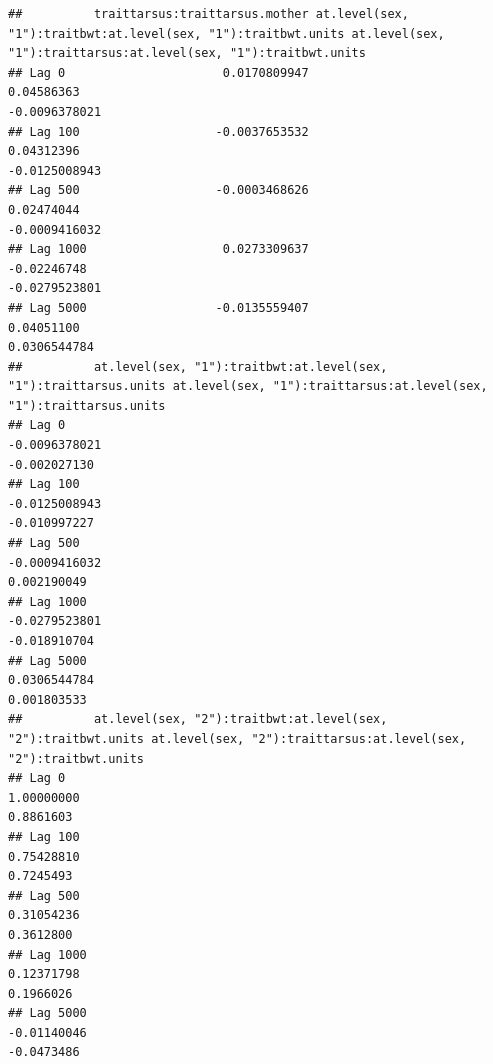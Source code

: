 \documentclass[
  12pt,
]{book}
\begin{document}
\begin{verbatim}
##          traittarsus:traittarsus.mother at.level(sex, "1"):traitbwt:at.level(sex, "1"):traitbwt.units at.level(sex, "1"):traittarsus:at.level(sex, "1"):traitbwt.units
## Lag 0                      0.0170809947                                                    0.04586363                                                    -0.0096378021
## Lag 100                   -0.0037653532                                                    0.04312396                                                    -0.0125008943
## Lag 500                   -0.0003468626                                                    0.02474044                                                    -0.0009416032
## Lag 1000                   0.0273309637                                                   -0.02246748                                                    -0.0279523801
## Lag 5000                  -0.0135559407                                                    0.04051100                                                     0.0306544784
##          at.level(sex, "1"):traitbwt:at.level(sex, "1"):traittarsus.units at.level(sex, "1"):traittarsus:at.level(sex, "1"):traittarsus.units
## Lag 0                                                       -0.0096378021                                                        -0.002027130
## Lag 100                                                     -0.0125008943                                                        -0.010997227
## Lag 500                                                     -0.0009416032                                                         0.002190049
## Lag 1000                                                    -0.0279523801                                                        -0.018910704
## Lag 5000                                                     0.0306544784                                                         0.001803533
##          at.level(sex, "2"):traitbwt:at.level(sex, "2"):traitbwt.units at.level(sex, "2"):traittarsus:at.level(sex, "2"):traitbwt.units
## Lag 0                                                       1.00000000                                                        0.8861603
## Lag 100                                                     0.75428810                                                        0.7245493
## Lag 500                                                     0.31054236                                                        0.3612800
## Lag 1000                                                    0.12371798                                                        0.1966026
## Lag 5000                                                   -0.01140046                                                       -0.0473486

\end{verbatim}
\end{document}
